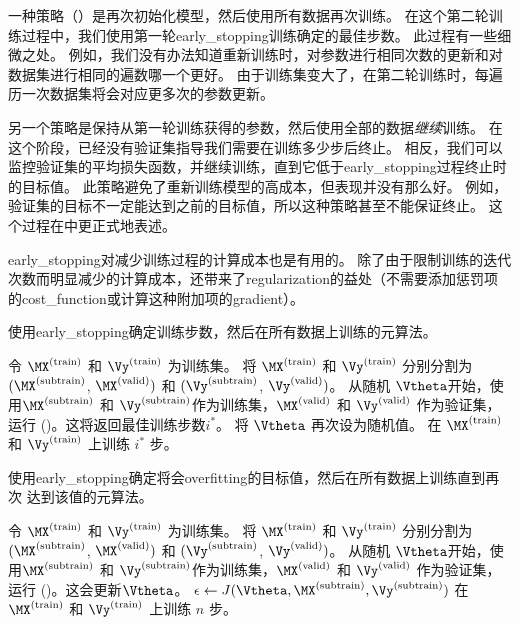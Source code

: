 
一种策略（）是再次初始化模型，然后使用所有数据再次训练。
在这个第二轮训练过程中，我们使用第一轮\gls{early_stopping}训练确定的最佳步数。
此过程有一些细微之处。
例如，我们没有办法知道重新训练时，对参数进行相同次数的更新和对数据集进行相同的遍数哪一个更好。
由于训练集变大了，在第二轮训练时，每遍历一次数据集将会对应更多次的参数更新。

另一个策略是保持从第一轮训练获得的参数，然后使用全部的数据\emph{继续}训练。
在这个阶段，已经没有验证集指导我们需要在训练多少步后终止。
相反，我们可以监控验证集的平均损失函数，并继续训练，直到它低于\gls{early_stopping}过程终止时的目标值。
此策略避免了重新训练模型的高成本，但表现并没有那么好。
例如，验证集的目标不一定能达到之前的目标值，所以这种策略甚至不能保证终止。
这个过程在中更正式地表述。

\gls{early_stopping}对减少训练过程的计算成本也是有用的。
除了由于限制训练的迭代次数而明显减少的计算成本，还带来了\gls{regularization}的益处（不需要添加惩罚项的\gls{cost_function}或计算这种附加项的\gls{gradient}）。

\begin{algorithm}[ht]
\caption{使用\gls{early_stopping}确定训练步数，然后在所有数据上训练的元算法。
}
\label{alg:early_stopping_retrain}
\begin{algorithmic}
\STATE 令 $\MX^{(\text{train})}$ 和 $\Vy^{(\text{train})}$ 为训练集。
\STATE 将 $\MX^{(\text{train})}$ 和 $\Vy^{(\text{train})}$ 分别分割为 $(\MX^{(\text{subtrain})}$, $\MX^{(\text{valid})})$ 和 $(\Vy^{(\text{subtrain})}$, $\Vy^{(\text{valid})})$。
\STATE 从随机 $\Vtheta$开始，使用$\MX^{(\text{subtrain})}$ 和 $\Vy^{(\text{subtrain})}$作为训练集，$\MX^{(\text{valid})}$ 和 $\Vy^{(\text{valid})}$ 作为验证集，运行 ()。这将返回最佳训练步数$i^*$。
\STATE 将 $\Vtheta$ 再次设为随机值。
\STATE 在 $\MX^{(\text{train})}$ 和 $\Vy^{(\text{train})}$ 上训练 $i^*$ 步。  
\end{algorithmic}
\end{algorithm}

\begin{algorithm}[ht]
\caption{
使用\gls{early_stopping}确定将会\gls{overfitting}的目标值，然后在所有数据上训练直到再次
达到该值的元算法。
}
\label{alg:early_stopping_continue}
\begin{algorithmic}
\STATE 令 $\MX^{(\text{train})}$ 和 $\Vy^{(\text{train})}$ 为训练集。
\STATE 将 $\MX^{(\text{train})}$ 和 $\Vy^{(\text{train})}$ 分别分割为 $(\MX^{(\text{subtrain})}$, $\MX^{(\text{valid})})$ 和 $(\Vy^{(\text{subtrain})}$, $\Vy^{(\text{valid})})$。
\STATE 从随机 $\Vtheta$开始，使用$\MX^{(\text{subtrain})}$ 和 $\Vy^{(\text{subtrain})}$作为训练集，$\MX^{(\text{valid})}$ 和 $\Vy^{(\text{valid})}$ 作为验证集，运行 ()。这会更新$\Vtheta$。
\STATE $\epsilon \leftarrow J(\Vtheta, \MX^{(\text{subtrain})},\Vy^{(\text{subtrain})})$
\STATE 在 $\MX^{(\text{train})}$ 和 $\Vy^{(\text{train})}$ 上训练 $n$ 步。  
\ENDWHILE
\end{algorithmic}
\end{algorithm}


